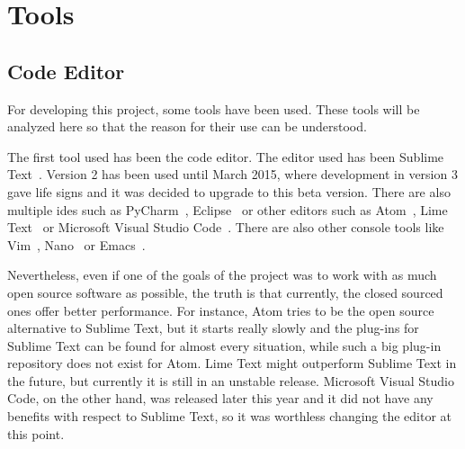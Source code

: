 \section{Tools}

\subsection{Code Editor}

For developing this project, some tools have been used. These tools will be analyzed here so that
the reason for their use can be understood.

The first tool used has been the code editor. The editor used has been Sublime
Text~\cite{sublime_web}. Version 2 has been used until March 2015, where development in version 3
gave life signs and it was decided to upgrade to this beta version. There are also multiple
\acrshort{ide}s such as PyCharm~\cite{pycharm_web}, Eclipse~\cite{eclipse_web} or other editors such
as Atom~\cite{atom_web}, Lime Text~\cite{lime_web} or Microsoft Visual Studio
Code~\cite{ms_code_web}. There are also other console tools like Vim~\cite{vim_web},
Nano~\cite{nano_web} or Emacs~\cite{emacs_web}.

Nevertheless, even if one of the goals of the project was to work with as much open source software
as possible, the truth is that currently, the closed sourced ones offer better performance. For
instance, Atom tries to be the open source alternative to Sublime Text, but it starts really slowly
and the plug-ins for Sublime Text can be found for almost every situation, while such a big plug-in
repository does not exist for Atom. Lime Text might outperform Sublime Text in the future, but
currently it is still in an unstable release. Microsoft Visual Studio Code, on the other hand, was
released later this year and it did not have any benefits with respect to Sublime Text, so it was
worthless changing the editor at this point.

